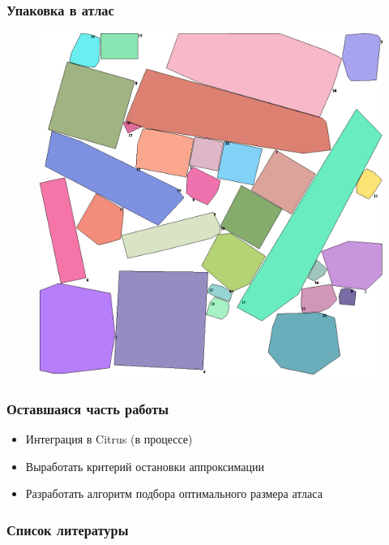 \documentclass[10pt, unicode]{beamer}
\begin{document}
    \begin{frame}
        \frametitle{Упаковка в атлас}
        \begin{figure}
            \centering
            \includegraphics[width=\linewidth, height=.9\textheight, keepaspectratio]{PackExample.png}
        \end{figure}
    \end{frame}
    \begin{frame}
        \frametitle{Оставшаяся часть работы}
        \begin{itemize}
            \item Интеграция в Citrus (в процессе)
            \item Выработать критерий остановки аппроксимации
            \item Разработать алгоритм подбора оптимального размера атласа
        \end{itemize}
    \end{frame}
    \begin{frame} %
        \frametitle{Список литературы}
        
        
    \end{frame}
\end{document}
